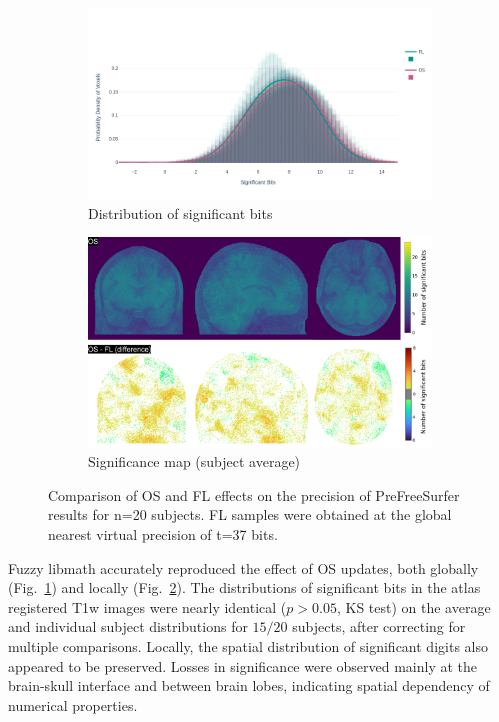 \begin{figure}[t]
  \begin{subfigure}[t]{0.52\linewidth}
    \centering
    \includegraphics[width=\linewidth]{chapters/chapter2/figures/mca-os-dist-comp-panel1.png}
    \caption{Distribution of significant bits}
    \label{fig:sigbits}
  \end{subfigure}
  \hfill
  \begin{subfigure}[t]{0.45\linewidth}
    \centering
    \includegraphics[width=\linewidth]{chapters/chapter2/figures/MNI-space.png}
    \caption{Significance map (subject average)}
    \label{fig:mnispace}
  \end{subfigure}
  \caption{Comparison of OS and FL effects on the precision of PreFreeSurfer results
   for n=20 subjects.
    FL samples were obtained at the global nearest virtual precision of t=37 bits. }
  \label{fig:mca-os-comp}
\end{figure}

Fuzzy libmath accurately reproduced the effect of OS updates, both globally
(Fig.~\ref{fig:sigbits}) and locally (Fig.~\ref{fig:mnispace}). The
distributions of significant bits in the atlas registered T1w images were nearly
identical ($p > 0.05$, KS test) on the average and individual subject distributions for $15/20$ subjects,
after correcting for multiple comparisons. Locally, the
spatial distribution of significant digits also appeared to be preserved. Losses
in significance were observed mainly at the brain-skull interface and between
brain lobes, indicating spatial dependency of numerical properties.

